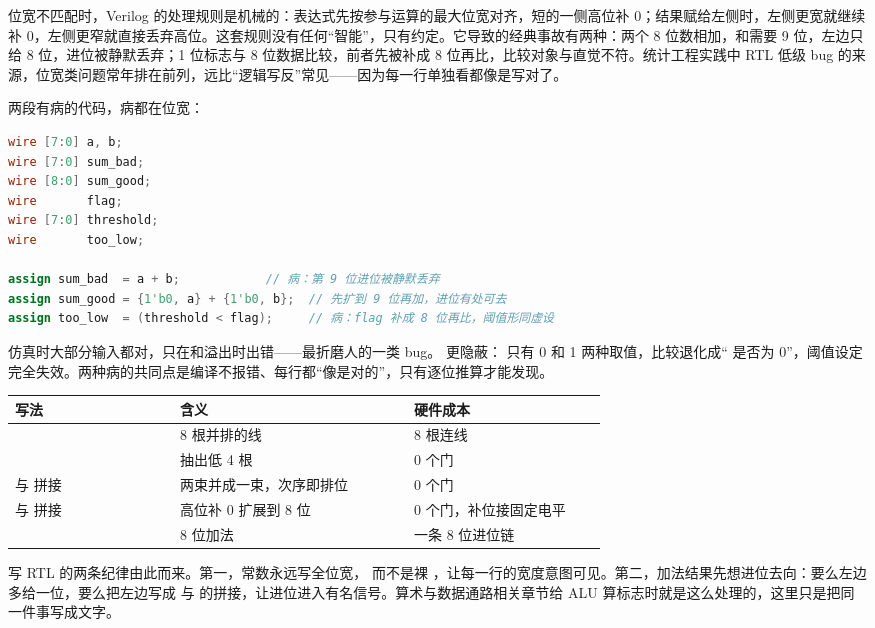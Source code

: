 位宽不匹配时，Verilog 的处理规则是机械的：表达式先按参与运算的最大位宽对齐，短的一侧高位补 0；结果赋给左侧时，左侧更宽就继续补 0，左侧更窄就直接丢弃高位。这套规则没有任何“智能”，只有约定。它导致的经典事故有两种：两个 8 位数相加，和需要 9 位，左边只给 8 位，进位被静默丢弃；1 位标志与 8 位数据比较，前者先被补成 8 位再比，比较对象与直觉不符。统计工程实践中 RTL 低级 bug 的来源，位宽类问题常年排在前列，远比“逻辑写反”常见——因为每一行单独看都像是写对了。

两段有病的代码，病都在位宽：

\begin{lstlisting}[language=Verilog]
wire [7:0] a, b;
wire [7:0] sum_bad;
wire [8:0] sum_good;
wire       flag;
wire [7:0] threshold;
wire       too_low;

assign sum_bad  = a + b;            // 病：第 9 位进位被静默丢弃
assign sum_good = {1'b0, a} + {1'b0, b};  // 先扩到 9 位再加，进位有处可去
assign too_low  = (threshold < flag);     // 病：flag 补成 8 位再比，阈值形同虚设
\end{lstlisting}

 仿真时大部分输入都对，只在和溢出时出错——最折磨人的一类 bug。 更隐蔽： 只有 0 和 1 两种取值，比较退化成“ 是否为 0”，阈值设定完全失效。两种病的共同点是编译不报错、每行都“像是对的”，只有逐位推算才能发现。

\begin{longtable}{L{0.24\linewidth}L{0.34\linewidth}L{0.28\linewidth}}
\toprule
写法 & 含义 & 硬件成本 \\
\midrule
{} & 8 根并排的线 & 8 根连线 \\\tablerowrule
{} & 抽出低 4 根 & 0 个门 \\\tablerowrule
{} 与  拼接 & 两束并成一束，次序即排位 & 0 个门 \\\tablerowrule
{} 与  拼接 & 高位补 0 扩展到 8 位 & 0 个门，补位接固定电平 \\\tablerowrule
{} & 8 位加法 & 一条 8 位进位链 \\
\bottomrule
\end{longtable}

写 RTL 的两条纪律由此而来。第一，常数永远写全位宽， 而不是裸 ，让每一行的宽度意图可见。第二，加法结果先想进位去向：要么左边多给一位，要么把左边写成  与  的拼接，让进位进入有名信号。算术与数据通路相关章节给 ALU 算标志时就是这么处理的，这里只是把同一件事写成文字。

